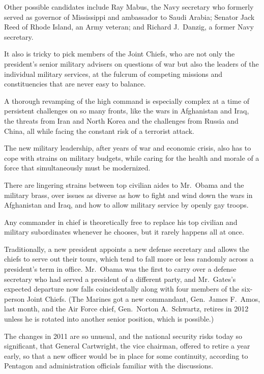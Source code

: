 ﻿\documentclass[12pt]{article}
\begin{document}
Other possible candidates include Ray Mabus, the Navy secretary who formerly served as governor of
Mississippi and ambassador to Saudi Arabia; Senator Jack Reed of Rhode Island, an Army veteran; and
Richard J.~Danzig, a former Navy secretary.

It also is tricky to pick members of the Joint Chiefs, who are not only the president's senior
military advisers on questions of war but also the leaders of the individual military services, at
the fulcrum of competing missions and constituencies that are never easy to balance.

A thorough revamping of the high command is especially complex at a time of persistent challenges on
so many fronts, like the wars in Afghanistan and Iraq, the threats from Iran and North Korea and the
challenges from Russia and China, all while facing the constant risk of a terrorist attack.

The new military leadership, after years of war and economic crisis, also has to cope with strains
on military budgets, while caring for the health and morale of a force that simultaneously must be
modernized.

There are lingering strains between top civilian aides to Mr.~Obama and the military brass, over
issues as diverse as how to fight and wind down the wars in Afghanistan and Iraq, and how to allow
military service by openly gay troops.

Any commander in chief is theoretically free to replace his top civilian and military subordinates
whenever he chooses, but it rarely happens all at once.

Traditionally, a new president appoints a new defense secretary and allows the chiefs to serve out
their tours, which tend to fall more or less randomly across a president's term in office. Mr.~Obama
was the first to carry over a defense secretary who had served a president of a different party, and
Mr.~Gates's expected departure now falls coincidentally along with four members of the six-person
Joint Chiefs. (The Marines got a new commandant, Gen.~James F.~Amos, last month, and the Air Force
chief, Gen.~Norton A.~Schwartz, retires in 2012 unless he is rotated into another senior position,
which is possible.)

The changes in 2011 are so unusual, and the national security risks today so significant, that
General Cartwright, the vice chairman, offered to retire a year early, so that a new officer would
be in place for some continuity, according to Pentagon and administration officials familiar with
the discussions.
\end{document}
